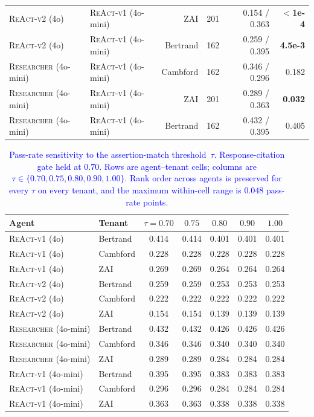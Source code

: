 \begin{table}[htbp]
\begin{tabular}{llrrrr}
\textsc{ReAct-v2} (4o) & \textsc{ReAct-v1} (4o-mini)    & ZAI      & 201 & 0.154 / 0.363 & \textbf{$<$1e-4} \\
\textsc{ReAct-v2} (4o) & \textsc{ReAct-v1} (4o-mini)    & Bertrand & 162 & 0.259 / 0.395 & \textbf{4.5e-3} \\
\textsc{Researcher} (4o-mini) & \textsc{ReAct-v1} (4o-mini)   & Cambford & 162 & 0.346 / 0.296 & 0.182 \\
\textsc{Researcher} (4o-mini) & \textsc{ReAct-v1} (4o-mini)   & ZAI      & 201 & 0.289 / 0.363 & \textbf{0.032} \\
\textsc{Researcher} (4o-mini) & \textsc{ReAct-v1} (4o-mini)   & Bertrand & 162 & 0.432 / 0.395 & 0.405 \\
\bottomrule
\end{tabular}
\end{table}

\begin{table}[htbp]
\centering
\footnotesize
\caption{\textcolor{blue}{Pass-rate sensitivity to the assertion-match threshold~$\tau$. Response-citation gate held at $0.70$. Rows are agent--tenant cells; columns are $\tau \in \{0.70, 0.75, 0.80, 0.90, 1.00\}$. Rank order across agents is preserved for every $\tau$ on every tenant, and the maximum within-cell range is $0.048$ pass-rate points.}}
\label{tab:threshold_sensitivity}
\begin{tabular}{llccccc}
\toprule
Agent & Tenant & $\tau{=}0.70$ & $0.75$ & $0.80$ & $0.90$ & $1.00$ \\
\midrule
\textsc{ReAct-v1} (4o)    & Bertrand & 0.414 & 0.414 & 0.401 & 0.401 & 0.401 \\
\textsc{ReAct-v1} (4o)    & Cambford & 0.228 & 0.228 & 0.228 & 0.228 & 0.228 \\
\textsc{ReAct-v1} (4o)    & ZAI      & 0.269 & 0.269 & 0.264 & 0.264 & 0.264 \\
\textsc{ReAct-v2} (4o)    & Bertrand & 0.259 & 0.259 & 0.253 & 0.253 & 0.253 \\
\textsc{ReAct-v2} (4o)    & Cambford & 0.222 & 0.222 & 0.222 & 0.222 & 0.222 \\
\textsc{ReAct-v2} (4o)    & ZAI      & 0.154 & 0.154 & 0.139 & 0.139 & 0.139 \\
\textsc{Researcher} (4o-mini)  & Bertrand & 0.432 & 0.432 & 0.426 & 0.426 & 0.426 \\
\textsc{Researcher} (4o-mini)  & Cambford & 0.346 & 0.346 & 0.340 & 0.340 & 0.340 \\
\textsc{Researcher} (4o-mini)  & ZAI      & 0.289 & 0.289 & 0.284 & 0.284 & 0.284 \\
\textsc{ReAct-v1} (4o-mini)    & Bertrand & 0.395 & 0.395 & 0.383 & 0.383 & 0.383 \\
\textsc{ReAct-v1} (4o-mini)    & Cambford & 0.296 & 0.296 & 0.284 & 0.284 & 0.284 \\
\textsc{ReAct-v1} (4o-mini)    & ZAI      & 0.363 & 0.363 & 0.338 & 0.338 & 0.338 \\
\bottomrule
\end{tabular}
\end{table}
\endgroup

